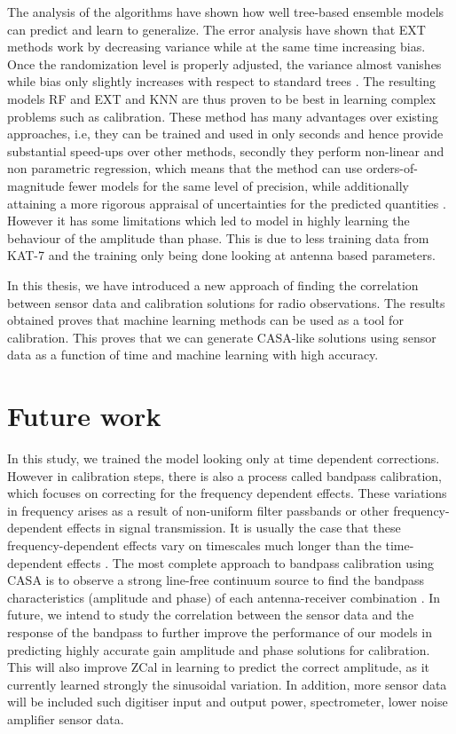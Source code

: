The analysis of the algorithms have shown how well tree-based ensemble models can predict and learn to generalize. The error
analysis have shown that EXT methods work by decreasing variance while at the same time increasing bias. Once the randomization level is properly adjusted, the variance almost vanishes while bias only slightly increases with respect to standard trees \citep{geurts2006extremely}. The resulting models RF and EXT and KNN are thus proven to be best in learning complex problems such as calibration. These method  has many advantages over
existing approaches, i.e, they can be trained
and used in only seconds and hence provide substantial
speed-ups over other methods, secondly they perform non-linear and non parametric regression, which means that the method can
use orders-of-magnitude fewer models for the same level
of precision, while additionally attaining a more rigorous
appraisal of uncertainties for the predicted quantities \citep{bellinger2016fundamental}. However it has some limitations which led to model in highly learning the behaviour of the amplitude than phase. This is due to less training data from KAT-7 and the training only being done looking at antenna based parameters. 

In this thesis, we have introduced a new approach of finding the correlation between sensor data and calibration solutions for radio observations. The results obtained proves that machine learning  methods can be used as a tool for calibration. This proves that we can generate CASA-like solutions using sensor data as a function of time and machine learning with high accuracy.

\chapter{Future work}

In this study, we trained the model looking only at time dependent corrections. However in calibration steps, there is also a process called bandpass calibration, which focuses on correcting for the frequency dependent effects. These variations in frequency arises as a result of non-uniform filter passbands or other frequency-dependent effects in signal transmission. It is usually the case that these frequency-dependent effects vary on timescales much longer than the time-dependent effects \citep{editioncasa}. The most complete approach to bandpass calibration using CASA is to observe a strong line-free continuum source to find the bandpass characteristics (amplitude and phase) of each antenna-receiver combination \citep{editioncasa}. In future, we intend to study the correlation between the sensor data and the response of the bandpass to further improve the performance of our models in predicting highly accurate gain amplitude and phase solutions for calibration. This will also improve ZCal in learning to predict the correct amplitude, as it currently learned strongly the sinusoidal variation. In addition, more sensor data will be included such digitiser input and output power, spectrometer, lower noise amplifier sensor data.  

 






